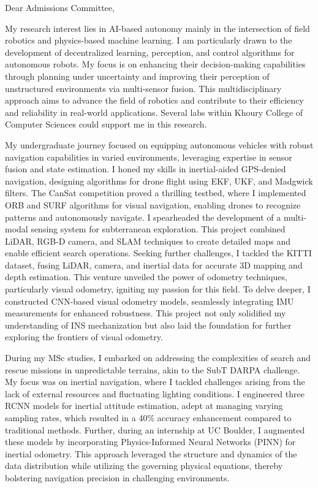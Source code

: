 \documentclass[a4,20pt]{article}
\begin{document}
\begin{large} 
Dear Admissions Committee,

My research interest lies in AI-based autonomy mainly in the intersection of field robotics and physics-based machine learning. I am particularly drawn to the development of decentralized learning, perception, and control algorithms for autonomous robots. My focus is on enhancing their decision-making capabilities through planning under uncertainty and improving their perception of unstructured environments via multi-sensor fusion. This multidisciplinary approach aims to advance the field of robotics and contribute to their efficiency and reliability in real-world applications. Several labs within Khoury College of Computer Sciences could support me in this research.


My undergraduate journey focused on equipping autonomous vehicles with robust navigation capabilities in varied environments, leveraging expertise in sensor fusion and state estimation. I honed my skills in inertial-aided GPS-denied navigation, designing algorithms for drone flight using EKF, UKF, and Madgwick filters. The CanSat competition proved a thrilling testbed, where I implemented ORB and SURF algorithms for visual navigation, enabling drones to recognize patterns and autonomously navigate. I spearheaded the development of a multi-modal sensing system for subterranean exploration. This project combined LiDAR, RGB-D camera, and SLAM techniques to create detailed maps and enable efficient search operations. Seeking further challenges, I tackled the KITTI dataset, fusing LiDAR, camera, and inertial data for accurate 3D mapping and depth estimation. This venture unveiled the power of odometry techniques, particularly visual odometry, igniting my passion for this field. To delve deeper, I constructed CNN-based visual odometry models, seamlessly integrating IMU measurements for enhanced robustness. This project not only solidified my understanding of INS mechanization but also laid the foundation for further exploring the frontiers of visual odometry.


During my MSc studies, I embarked on addressing the complexities of search and rescue missions in unpredictable terrains, akin to the SubT DARPA challenge. My focus was on inertial navigation, where I tackled challenges arising from the lack of external resources and fluctuating lighting conditions. I engineered three RCNN models for inertial attitude estimation, adept at managing varying sampling rates, which resulted in a 40\% accuracy enhancement compared to traditional methods. Further, during an internship at UC Boulder, I augmented these models by incorporating Physics-Informed Neural Networks (PINN) for inertial odometry. This approach leveraged the structure and dynamics of the data distribution while utilizing the governing physical equations, thereby bolstering navigation precision in challenging environments.


\end{large}
\end{document}
